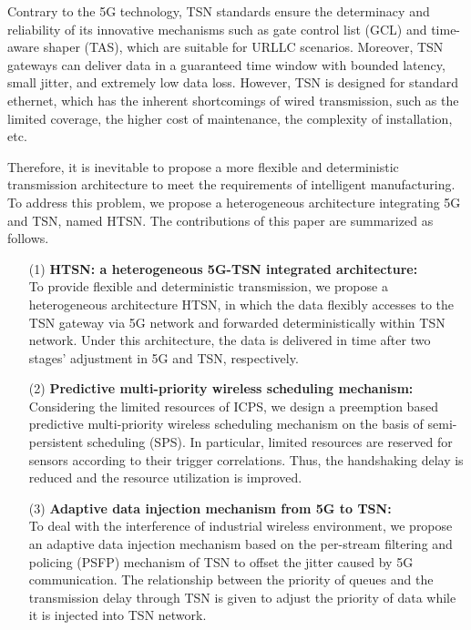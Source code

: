 \documentclass{SCIS2021}
\begin{document}
	\par Contrary to the 5G technology, TSN standards ensure the determinacy and reliability of its innovative mechanisms such as gate control list (GCL) and time-aware shaper (TAS), which are suitable for {\color{black}URLLC} scenarios. Moreover, TSN gateways can deliver data in a guaranteed time window with bounded latency, small jitter, and extremely low data loss\cite{farkas20195g}. However, TSN is designed for standard ethernet, which has the inherent shortcomings of wired transmission, such as the limited coverage, the higher cost of maintenance, the complexity of installation, etc.

	\par Therefore, it is inevitable to propose a more flexible and deterministic transmission architecture to meet the requirements of intelligent manufacturing. {\color{black}To address this problem, we propose a heterogeneous architecture integrating 5G and TSN, named HTSN.} The contributions of this paper are summarized as follows.


	\begin{itemize}[itemsep=15pt,topsep=0pt]
		\item[(1)]
		\setlength{\itemsep}{15pt }
		\textbf{HTSN: {\color{black}a heterogeneous 5G-TSN integrated architecture}:}\\
		To provide flexible and deterministic transmission, we propose a heterogeneous architecture HTSN, in which the data flexibly accesses to the {\color{black}TSN gateway via 5G network and forwarded deterministically within TSN network}. Under this architecture, {\color{black}the data is delivered in time after two stages' adjustment in 5G and TSN, respectively.}
	\end{itemize}

	\begin{itemize}[itemsep= 15pt,topsep =-0 pt]
		\item[(2)]
		\textbf{Predictive multi-priority wireless scheduling mechanism:}\\
		Considering the limited resources of {\color{black}ICPS}, we design a preemption based predictive multi-priority wireless scheduling mechanism on the basis of semi-persistent scheduling (SPS). {\color{black}In particular, limited resources are reserved for sensors according to their trigger correlations. Thus, the handshaking delay is reduced and the resource utilization is improved.}
	\end{itemize}

	\begin{itemize}[itemsep= 15pt,topsep = -0 pt]
		\item[(3)]
		\textbf{Adaptive data injection mechanism {\color{black}from 5G to TSN}:}\\
		{\color{black}To deal with the interference of industrial wireless environment, we propose an adaptive data injection mechanism based on the per-stream filtering and policing (PSFP) mechanism of TSN to offset the jitter caused by 5G communication. The relationship between the priority of queues and the transmission delay through TSN is given to adjust the priority of data while it is injected into TSN network.}
	\end{itemize}
\end{document}
